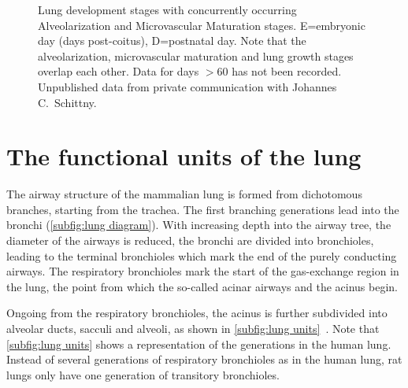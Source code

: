 \begin{figure}[htb]
	\noindent\makebox[\textwidth]{%
		\centering%
		}%
	\caption[Lung development stages]{Lung development stages with concurrently occurring Alveolarization and Microvascular Maturation stages. E=embryonic day (days post-coitus), D=postnatal day. Note that the alveolarization, microvascular maturation and lung growth stages overlap each other. Data for days $>$60 has not been recorded. Unpublished data from private communication with Johannes C.\ Schittny.}
	\label{fig:lung development stages new}
\end{figure}

\section{The functional units of the lung}
The airway structure of the mammalian lung is formed from dichotomous branches, starting from the trachea. The first branching generations lead into the bronchi (\autoref{subfig:lung diagram}). With increasing depth into the airway tree, the diameter of the airways is reduced, the bronchi are divided into bronchioles, leading to the terminal bronchioles which mark the end of the purely conducting airways. The respiratory bronchioles mark the start of the gas-exchange region in the lung, the point from which the so-called acinar airways and the acinus begin. 

Ongoing from the respiratory bronchioles, the acinus is further subdivided into alveolar ducts, sacculi and alveoli, as shown in \autoref{subfig:lung units}~\cite{Haefeli-Bleuer1988,Weibel1963,Weibel2009,Schittny2007a}. Note that \autoref{subfig:lung units} shows a representation of the generations in the human lung. Instead of several generations of respiratory bronchioles as in the human lung, rat lungs only have one generation of transitory bronchioles.

